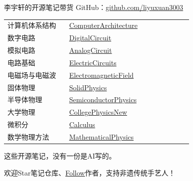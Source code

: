 \begin{frame}{李宇轩的开源笔记带货}
    \small
    GitHub：\href{https://github.com/liyuxuan3003}{\alert{github.com/liyuxuan3003}}
    \medskip

    \renewcommand{\arraystretch}{1.15}
    \begin{tabular}{p{0.30\linewidth}p{0.60\linewidth}}
        计算机体系结构 & \href{https://github.com/liyuxuan3003/ComputerArchitecture}{\alert{ComputerArchitecture}} \\
        数字电路 & \href{https://github.com/liyuxuan3003/DigitalCircuit}{\alert{DigitalCircuit}} \\
        模拟电路 & \href{https://github.com/liyuxuan3003/AnalogCircuit}{\alert{AnalogCircuit}} \\
        电路基础 & \href{https://github.com/liyuxuan3003/ElectricCircuits}{\alert{ElectricCircuits}} \\
        电磁场与电磁波 & \href{https://github.com/liyuxuan3003/ElectromagneticField}{\alert{ElectromagneticField}} \\
        固体物理 & \href{https://github.com/liyuxuan3003/SolidPhysics}{\alert{SolidPhysics}} \\
        半导体物理 & \href{https://github.com/liyuxuan3003/SemiconductorPhysics}{\alert{SemiconductorPhysics}} \\
        大学物理 & \href{https://github.com/liyuxuan3003/CollegePhysicsNew}{\alert{CollegePhysicsNew}} \\
        微积分 & \href{https://github.com/liyuxuan3003/Calculus}{\alert{Calculus}} \\
        数学物理方法 & \href{https://github.com/liyuxuan3003/MathematicalPhysics}{\alert{MathematicalPhysics}} \\
    \end{tabular}
    \medskip

    \alert{这些开源笔记，没有一份是AI写的。}\par
    欢迎\alert{Star}笔记仓库、\href{https://github.com/liyuxuan3003}{\alert{Follow}}作者，支持非遗传统手艺人！
\end{frame}

